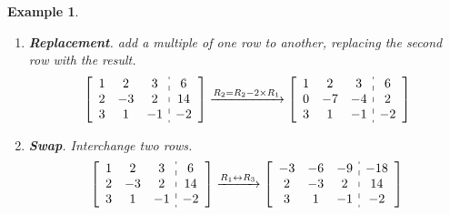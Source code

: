 \documentclass[12pt, a4paper]{article}
\newtheorem{eg}{Example}[subsection]
\newtheorem*{rmk}{\indent Remark}
\begin{document}
\begin{eg}
\begin{enumerate}
\begin{rmk}Here, the notation $R_1$ simply means "the first row."\end{rmk}
\item \textbf{Replacement}. add a multiple of one row to another, replacing the second row with the result. 
$$\left[\begin{array}{c:c}\begin{matrix}1&2&3\\2&-3&2\\3&1&-1\end{matrix}&\begin{matrix}6\\14\\-2\end{matrix}\end{array}\right]\xrightarrow[]{R_2=R_2-2\times R_1} \left[\begin{array}{c:c}\begin{matrix}1&2&3\\0&-7&-4\\3&1&-1\end{matrix}&\begin{matrix}6\\2\\-2\end{matrix}\end{array}\right]$$
\item \textbf{Swap}. Interchange two rows. 
$$\left[\begin{array}{c:c}\begin{matrix}1&2&3\\2&-3&2\\3&1&-1\end{matrix}&\begin{matrix}6\\14\\-2\end{matrix}\end{array}\right]\xrightarrow[]{R_1\leftrightarrow R_3} \left[\begin{array}{c:c}\begin{matrix}-3&-6&-9\\2&-3&2\\3&1&-1\end{matrix}&\begin{matrix}-18\\14\\-2\end{matrix}\end{array}\right]$$
\end{enumerate}
\end{eg}
\end{document}
